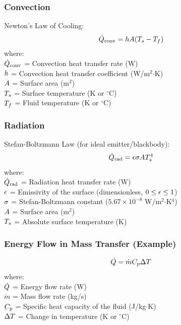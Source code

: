 \subsubsection*{Convection}
Newton's Law of Cooling:
\begin{equation}
    \dot{Q}_{\text{conv}} = h A (T_s - T_f)
\end{equation}
where: \\
$\dot{Q}_{\text{conv}}$ = Convection heat transfer rate (W) \\
$h$ = Convection heat transfer coefficient (W/m$^2$$\cdot$K) \\
$A$ = Surface area (m$^2$) \\
$T_s$ = Surface temperature (K or $^\circ$C) \\
$T_f$ = Fluid temperature (K or $^\circ$C)

\subsubsection*{Radiation}
Stefan-Boltzmann Law (for ideal emitter/blackbody):
\begin{equation}
    \dot{Q}_{\text{rad}} = \epsilon \sigma A T_s^4
\end{equation}
where: \\
$\dot{Q}_{\text{rad}}$ = Radiation heat transfer rate (W) \\
$\epsilon$ = Emissivity of the surface (dimensionless, $0 \le \epsilon \le 1$) \\
$\sigma$ = Stefan-Boltzmann constant ($5.67 \times 10^{-8}$ W/m$^2$$\cdot$K$^4$) \\
$A$ = Surface area (m$^2$) \\
$T_s$ = Absolute surface temperature (K)

\subsubsection*{Energy Flow in Mass Transfer (Example)}
\begin{equation}
    \dot{Q} = \dot{m} C_p \Delta T
\end{equation}
where: \\
$\dot{Q}$ = Energy flow rate (W) \\
$\dot{m}$ = Mass flow rate (kg/s) \\
$C_p$ = Specific heat capacity of the fluid (J/kg$\cdot$K) \\
$\Delta T$ = Change in temperature (K or $^\circ$C)